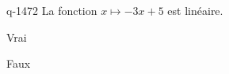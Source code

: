 \begin{truefalse}{q-1472}
La fonction $x\mapsto -3x+5$ est linéaire.
\item Vrai
\item* Faux
\end{truefalse}

